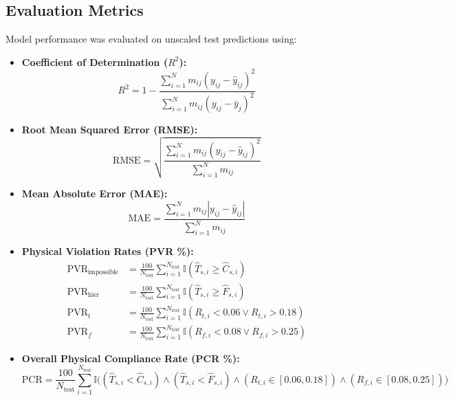 \documentclass[conference]{IEEEtran}
\begin{document}
\subsection{Evaluation Metrics}
Model performance was evaluated on unscaled test predictions using:
\begin{itemize}
    \item \textbf{Coefficient of Determination ($R^2$):}
    \begin{equation}
        R^2 = 1 - \frac{\sum_{i=1}^N m_{ij}(y_{ij} - \hat{y}_{ij})^2}{\sum_{i=1}^N m_{ij}(y_{ij} - \bar{y}_j)^2}
    \end{equation}
    \item \textbf{Root Mean Squared Error (RMSE):}
    \begin{equation}
        \text{RMSE} = \sqrt{\frac{\sum_{i=1}^N m_{ij}(y_{ij} - \hat{y}_{ij})^2}{\sum_{i=1}^N m_{ij}}}
    \end{equation}
    \item \textbf{Mean Absolute Error (MAE):}
    \begin{equation}
        \text{MAE} = \frac{\sum_{i=1}^N m_{ij} |y_{ij} - \hat{y}_{ij}|}{\sum_{i=1}^N m_{ij}}
    \end{equation}
    \item \textbf{Physical Violation Rates (PVR \%):}
    \begin{align}
        \text{PVR}_{\text{impossible}} &= \frac{100}{N_{\text{test}}} \sum_{i=1}^{N_{\text{test}}} \mathbb{I}(\hat{T}_{s,i} \ge \hat{C}_{s,i}) \\
        \text{PVR}_{\text{hier}} &= \frac{100}{N_{\text{test}}} \sum_{i=1}^{N_{\text{test}}} \mathbb{I}(\hat{T}_{s,i} \ge \hat{F}_{s,i}) \\
        \text{PVR}_t &= \frac{100}{N_{\text{test}}} \sum_{i=1}^{N_{\text{test}}} \mathbb{I}(R_{t,i} < 0.06 \lor R_{t,i} > 0.18) \\
        \text{PVR}_f &= \frac{100}{N_{\text{test}}} \sum_{i=1}^{N_{\text{test}}} \mathbb{I}(R_{f,i} < 0.08 \lor R_{f,i} > 0.25)
    \end{align}
    \item \textbf{Overall Physical Compliance Rate (PCR \%):}
    \begin{equation}
        \text{PCR} = \frac{100}{N_{\text{test}}} \sum_{i=1}^{N_{\text{test}}} \mathbb{I}\Big( (\hat{T}_{s,i} < \hat{C}_{s,i}) \land (\hat{T}_{s,i} < \hat{F}_{s,i}) \land (R_{t,i} \in [0.06, 0.18]) \land (R_{f,i} \in [0.08, 0.25]) \Big)
    \end{equation}
\end{itemize}
\end{document}
